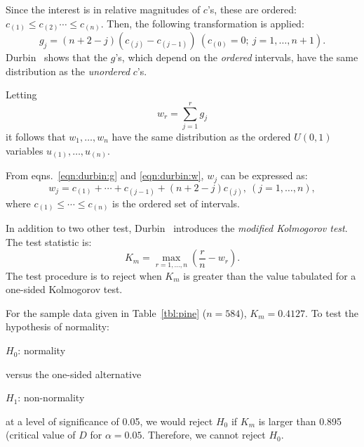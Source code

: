 \documentclass[draft]{article}
\newenvironment{example}{%
   \vspace{\baselineskip}
   \par\noindent\hrulefill\par
   \noindent{\em Example:}}{%
   \par\noindent\hrulefill\par
   \vspace{\baselineskip}}
\begin{document}
Since the interest is in relative magnitudes of \(c\)'s, these
are ordered:
\(c_{\left(1\right)} \le c_{\left(2\right)} \cdots
\le c_{\left(n\right)}\). Then, the following transformation
is applied:
\begin{equation}
\label{eqn:durbin:g}
g_j=\left(n+2-j\right)\left(c_{\left(j\right)}
-c_{\left(j-1\right)}\right)\:
\left(c_{\left(0\right)}=0;\: j=1,\ldots,n+1\right).
\end{equation}
Durbin~\cite{durbin61} shows that the \(g\)'s, which depend
on the {\em ordered\/} intervals, have the same
distribution as the {\em unordered\/} \(c\)'s.

Letting
\begin{equation}
\label{eqn:durbin:w}
w_r = \sum_{j=1}^r g_j
\end{equation}
it follows that \(w_1, \ldots, w_n\) have the same distribution
as the ordered \(U\left(0,1\right)\) variables
\(u_{\left(1\right)}, \ldots, u_{\left(n\right)}\).

From eqns.~\ref{eqn:durbin:g} and \ref{eqn:durbin:w}, \(w_j\)
can be expressed as:
\begin{equation}
w_j=c_{\left(1\right)} + \cdots
+ c_{\left(j-1\right)} + \left(n+2-j\right)c_{\left(j\right)},\:
\left(j=1,\ldots,n\right),
\end{equation}
where
\(c_{\left(1\right)} \le \cdots \le c_{\left(n\right)}\) is
the ordered set of intervals.

In addition to two other test, Durbin~\cite{durbin61} introduces
the {\em modified Kolmogorov test}. The test statistic is:
\begin{equation}
K_m = \max_{r=1,\ldots,n}\left(\frac{r}{n}-w_r\right).
\end{equation}
The test procedure is to reject when \(K_m\) is greater
than the value tabulated for a one-sided Kolmogorov test.

\begin{example}
For the sample data given in Table~\ref{tbl:pine} (\(n=584\)),
\(K_m = 0.4127\). To test the
hypothesis of normality:

\(H_0\): normality

\noindent versus the one-sided alternative

\(H_1\): non-normality

\noindent at a level of significance of 0.05, we would
reject \(H_0\) if \(K_m\) is larger
than 0.895 (critical value of \(D\) for \(\alpha=0.05\).
Therefore, we cannot reject \(H_0\).
\end{example}
\end{document}
